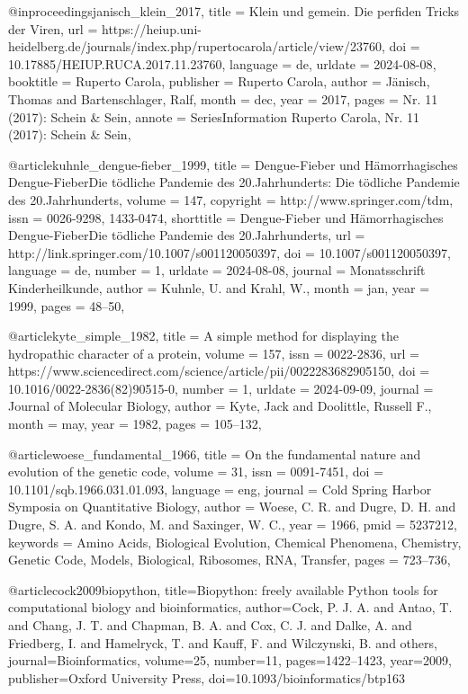 \documentclass[german,version-2022-01]{uzl-thesis}
\begin{document}
\begin{bibtex-entries}
@inproceedings{janisch_klein_2017,
	title = {Klein und gemein. {Die} perfiden {Tricks} der {Viren}},
	url = {https://heiup.uni-heidelberg.de/journals/index.php/rupertocarola/article/view/23760},
	doi = {10.17885/HEIUP.RUCA.2017.11.23760},
	language = {de},
	urldate = {2024-08-08},
	booktitle = {Ruperto {Carola}},
	publisher = {Ruperto Carola},
	author = {J\"anisch, Thomas and Bartenschlager, Ralf},
	month = dec,
	year = {2017},
	pages = {Nr. 11 (2017): Schein \& Sein},
	annote = {SeriesInformation
Ruperto Carola, Nr. 11 (2017): Schein \& Sein},
}

@article{kuhnle_dengue-fieber_1999,
	title = {Dengue-{Fieber} und {H\"amorrhagisches} {Dengue}-{FieberDie} t\"odliche {Pandemie} des 20.{Jahrhunderts}: {Die} t\"odliche {Pandemie} des 20.{Jahrhunderts}},
	volume = {147},
	copyright = {http://www.springer.com/tdm},
	issn = {0026-9298, 1433-0474},
	shorttitle = {Dengue-{Fieber} und {H\"amorrhagisches} {Dengue}-{FieberDie} t\"odliche {Pandemie} des 20.{Jahrhunderts}},
	url = {http://link.springer.com/10.1007/s001120050397},
	doi = {10.1007/s001120050397},
	language = {de},
	number = {1},
	urldate = {2024-08-08},
	journal = {Monatsschrift Kinderheilkunde},
	author = {Kuhnle, U. and Krahl, W.},
	month = jan,
	year = {1999},
	pages = {48--50},
}

@article{kyte_simple_1982,
	title = {A simple method for displaying the hydropathic character of a protein},
	volume = {157},
	issn = {0022-2836},
	url = {https://www.sciencedirect.com/science/article/pii/0022283682905150},
	doi = {10.1016/0022-2836(82)90515-0},
	number = {1},
	urldate = {2024-09-09},
	journal = {Journal of Molecular Biology},
	author = {Kyte, Jack and Doolittle, Russell F.},
	month = may,
	year = {1982},
	pages = {105--132},
}

@article{woese_fundamental_1966,
	title = {On the fundamental nature and evolution of the genetic code},
	volume = {31},
	issn = {0091-7451},
	doi = {10.1101/sqb.1966.031.01.093},
	language = {eng},
	journal = {Cold Spring Harbor Symposia on Quantitative Biology},
	author = {Woese, C. R. and Dugre, D. H. and Dugre, S. A. and Kondo, M. and Saxinger, W. C.},
	year = {1966},
	pmid = {5237212},
	keywords = {Amino Acids, Biological Evolution, Chemical Phenomena, Chemistry, Genetic Code, Models, Biological, Ribosomes, RNA, Transfer},
	pages = {723--736},
}

@article{cock2009biopython,
  title={Biopython: freely available Python tools for computational biology and bioinformatics},
  author={Cock, P. J. A. and Antao, T. and Chang, J. T. and Chapman, B. A. and Cox, C. J. and Dalke, A. and Friedberg, I. and Hamelryck, T. and Kauff, F. and Wilczynski, B. and others},
  journal={Bioinformatics},
  volume={25},
  number={11},
  pages={1422--1423},
  year={2009},
  publisher={Oxford University Press},
  doi={10.1093/bioinformatics/btp163}
}


\end{bibtex-entries}
\end{document}
